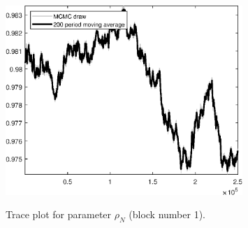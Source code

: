\begin{figure}[H]
\centering
  \includegraphics[width=0.8\textwidth]{BRS_imp_mobility/graphs/TracePlot_rho_N_blck_1}\\
    \caption{Trace plot for parameter ${\rho_N}$ (block number 1).}
\end{figure}
